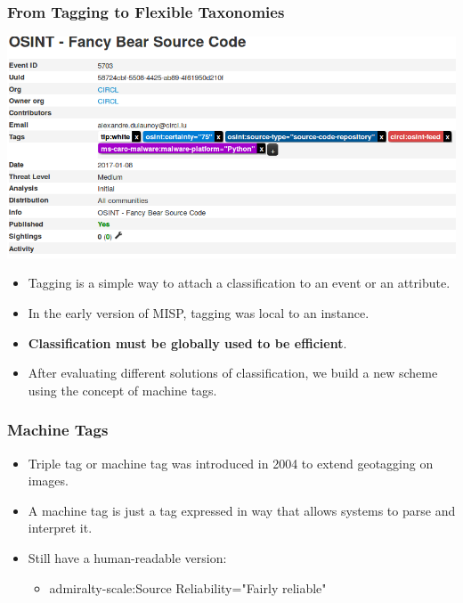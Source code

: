 
\begin{frame}[t,plain]
\titlepage
\end{frame}

\begin{frame}
\frametitle{From Tagging to Flexible Taxonomies}
\includegraphics[scale=0.3]{tags.png}
\begin{itemize}
   \item Tagging is a simple way to attach a classification to an event or an attribute.
   \item In the early version of MISP, tagging was local to an instance.
   \item {\bf Classification must be globally used to be efficient}.
   \item After evaluating different solutions of classification, we build a new scheme using the concept of machine tags.
\end{itemize}
\end{frame}

\begin{frame}
\frametitle{Machine Tags}
        \begin{itemize}
                \item Triple tag or machine tag was introduced in 2004 to extend geotagging on images.
        \end{itemize}
        {
                \setlength{\fboxsep}{1pt}
                \setlength{\fboxrule}{1pt}
        }
        \begin{itemize}
        \item A machine tag is just a tag expressed in way that allows systems to parse and interpret it.
        \item Still have a human-readable version:\\
        \begin{itemize}
                \item admiralty-scale:Source Reliability="Fairly reliable"
        \end{itemize}
        \end{itemize}
\end{frame}

